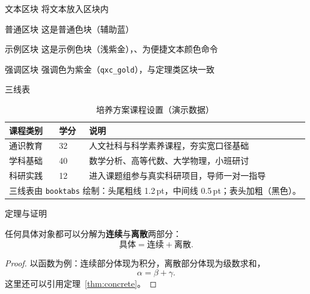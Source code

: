 \documentclass[10pt,aspectratio=169,hyperref={colorlinks,citecolor=qxc_blue,urlcolor=qxc_blue,linkcolor=}]{beamer}
\theoremstyle{plain}
\begin{document}
\begin{frame}{文本区块}
  将文本放入区块内

  \begin{block}{普通区块}
    这是普通色块（辅助蓝）
  \end{block}

  \begin{exampleblock}{示例区块}
    这是示例色块（浅紫金），、为便捷文本颜色命令
  \end{exampleblock}

  \begin{alertblock}{强调区块}
    强调色为紫金（\texttt{qxc\_gold}），与定理类区块一致
  \end{alertblock}
\end{frame}

\begin{frame}{三线表}
    \begin{table}
        \caption{培养方案课程设置（演示数据）}
        \label{tab:course}
        \setlength{\parskip}{0pt}%
        \footnotesize
        \setlength{\tabcolsep}{3pt}
        \begin{tabular}{p{50pt}p{70pt}p{190pt}}
        \toprule
        {\bfseries 课程类别}&
        {\bfseries 学分}&
        {\bfseries 说明} \\
        \midrule
        通识教育&
        32&
        人文社科与科学素养课程，夯实宽口径基础 \\
        学科基础&
        40&
        数学分析、高等代数、大学物理，小班研讨 \citep{njust} \\
        科研实践&
        12&
        进入课题组参与真实科研项目，导师一对一指导 \\
        \bottomrule
        \multicolumn{3}{p{310pt}}{三线表由 \texttt{booktabs} 绘制：头尾粗线 1.2\,pt，中间线 0.5\,pt；表头加粗（黑色）。}
        \end{tabular}
    \end{table}
\end{frame}

\begin{frame}{定理与证明}
\begin{theorem}[具体与连续]\label{thm:concrete}
  任何具体对象都可以分解为\textbf{连续}与\textbf{离散}两部分：
  \[
    \textbf{具体} = \textbf{连续} + \textbf{离散}.
  \]
\end{theorem}

\begin{proof}
  以函数为例：连续部分体现为积分，离散部分体现为级数求和，
  \begin{equation}\label{eq:alpha}
    \alpha = \beta + \gamma.
  \end{equation}
  这里还可以引用定理~\ref{thm:concrete}。
\end{proof}
\end{frame}
\end{document}
